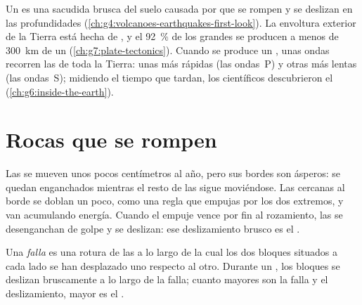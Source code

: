 \begin{recall}
Un \emph{} es una sacudida brusca del suelo causada por  que
se rompen y se deslizan en las profundidades
(\cref{ch:g4:volcanoes-earthquakes-first-look}). La envoltura exterior de
la Tierra está hecha de , y el 92~\% de los grandes  se
producen a menos de \qty{300}{km} de un 
(\cref{ch:g7:plate-tectonics}). Cuando se produce un , unas ondas
recorren las  de toda la Tierra: unas más rápidas (las ondas~P) y
otras más lentas (las ondas~S); midiendo el tiempo que tardan, los
científicos descubrieron el  (\cref{ch:g6:inside-the-earth}).
\end{recall}

\section{Rocas que se rompen}

Las  se mueven unos pocos centímetros al año, pero sus bordes son
ásperos: se quedan enganchados mientras el resto de las  sigue
moviéndose. Las  cercanas al borde se doblan un poco, como una regla
que empujas por los dos extremos, y van acumulando energía. Cuando el empuje
vence por fin al rozamiento, las  se desenganchan de golpe y se
deslizan: ese deslizamiento brusco es el .

\begin{definition}[Falla]\label{def:g7:earthquakes:fault}
Una \emph{falla} es una rotura de las  a lo largo de la
cual los dos bloques situados a cada lado se han desplazado uno respecto
al otro. Durante un , los bloques se deslizan bruscamente a lo
largo de la falla; cuanto mayores son la falla y el deslizamiento, mayor es
el .
\end{definition}

